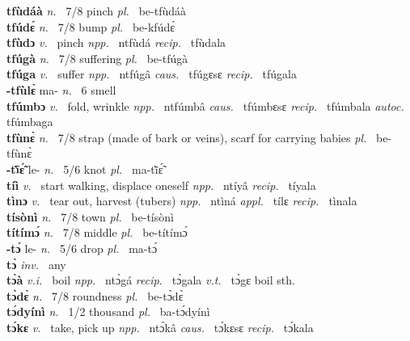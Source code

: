{\bfseries tfùdáà}  {\itshape n.~} 7/8 pinch {\itshape pl.~} be-tfùdáà    \\ 
{\bfseries tfúdɛ́}  {\itshape n.~} 7/8 bump {\itshape pl.~} be-kfúdɛ́    \\ 
{\bfseries tfùdɔ}  {\itshape v.~} pinch   {\itshape npp.~} ntfùdá {\itshape recip.~} tfùdala  \\ 
{\bfseries tfúgà}  {\itshape n.~} 7/8 suffering {\itshape pl.~} be-tfúgà    \\ 
{\bfseries tfúga}  {\itshape v.~} suffer   {\itshape npp.~} ntfúgâ {\itshape caus.~} tfúgɛsɛ {\itshape recip.~} tfúgala  \\ 
{\bfseries -tfùlɛ̀} ma- {\itshape n.~} 6 smell    \\ 
{\bfseries tfúmbɔ}  {\itshape v.~} fold, wrinkle   {\itshape npp.~} ntfúmbâ {\itshape caus.~} tfúmbɛsɛ {\itshape recip.~} tfúmbala {\itshape autoc.~} tfúmbaga  \\ 
{\bfseries tfùnɛ̀}   {\itshape n.~} 7/8 strap (made of bark or veins), scarf for carrying babies {\itshape pl.~} be-tfùnɛ̀    \\ 
{\bfseries -tĩ̀ɛ̃́} le- {\itshape n.~} 5/6 knot {\itshape pl.~} ma-tĩ̀ɛ̃́    \\ 
{\bfseries tíì}  {\itshape v.~} start walking, displace oneself   {\itshape npp.~} ntíyâ {\itshape recip.~} tíyala  \\ 
{\bfseries tìnɔ}  {\itshape v.~} tear out, harvest (tubers)   {\itshape npp.~} ntìná {\itshape appl.~} tílɛ {\itshape recip.~} tìnala  \\ 
{\bfseries tísònì}  {\itshape n.~} 7/8 town {\itshape pl.~} be-tísònì    \\ 
{\bfseries títímɔ́}  {\itshape n.~} 7/8 middle {\itshape pl.~} be-títímɔ́    \\ 
{\bfseries -tɔ́} le- {\itshape n.~} 5/6 drop {\itshape pl.~} ma-tɔ́    \\ 
{\bfseries tɔ̀}  {\itshape inv.~} any    \\ 
{\bfseries tɔ̀à }  {\itshape v.i.~} boil   {\itshape npp.~} ntɔ̀gá {\itshape recip.~} tɔ̀gala {\itshape v.t.~} tɔ̀gɛ boil sth. \\ 
{\bfseries tɔ̀dɛ̀}  {\itshape n.~} 7/8 roundness {\itshape pl.~} be-tɔ̀dɛ̀    \\ 
{\bfseries tɔ́dyínì}  {\itshape n.~} 1/2 thousand {\itshape pl.~} ba-tɔ́dyínì    \\ 
{\bfseries tɔ́kɛ}  {\itshape v.~} take, pick up   {\itshape npp.~} ntɔ́kâ {\itshape caus.~} tɔ́kɛsɛ {\itshape recip.~} tɔ́kala  \\ 
